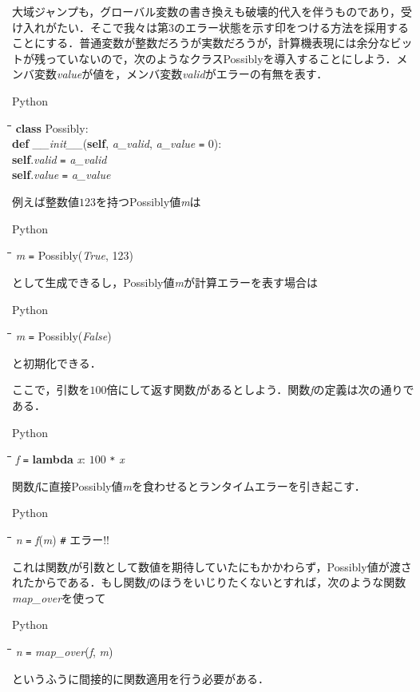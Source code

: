 \documentclass[twocolumn]{jsbook}
\newenvironment{pythoncode}{\begin{itembox}[r]{Python}}{\end{itembox}}
\newenvironment{python}{\begin{tabbing}\hspace*{1em}\=\hspace*{1em}\=\hspace*{1em}\=\hspace*{1em}\=\kill}{\end{tabbing}}
\newcommand{\pthnClassname}[1]{\textrm{#1}}
\newcommand{\pthnId}[1]{\textit{#1}}
\newcommand{\pthnKeyword}[1]{\textbf{#1}}
\newcommand{\pthnOp}[1]{\texttt{#1}}
\begin{document}
大域ジャンプも，グローバル変数の書き換えも破壊的代入を伴うものであり，受け入れがたい．そこで我々は第3のエラー状態を示す印をつける方法を採用することにする．普通変数が整数だろうが実数だろうが，計算機表現には余分なビットが残っていないので，次のようなクラス\pthnClassname{Possibly}を導入することにしよう．メンバ変数\pthnId{value}が値を，メンバ変数\pthnId{valid}がエラーの有無を表す．
\begin{pythoncode}
\begin{python}
\pthnKeyword{class} \pthnClassname{Possibly}:\\
\>\pthnKeyword{def} \pthnId{\_\_init\_\_}(\pthnKeyword{self}, \pthnId{a\_valid}, \pthnId{a\_value} \pthnOp{=} $0$):\\
\>\>\pthnKeyword{self}.\pthnId{valid} \pthnOp{=} \pthnId{a\_valid}\\
\>\>\pthnKeyword{self}.\pthnId{value} \pthnOp{=} \pthnId{a\_value}
\end{python}
\end{pythoncode}

例えば整数値$123$を持つPossibly値\pthnId{m}は
\begin{pythoncode}
\begin{python}
\pthnId{m} \pthnOp{=} \pthnClassname{Possibly}(\pthnId{True}, 123)
\end{python}
\end{pythoncode}
として生成できるし，\pthnClassname{Possibly}値\pthnId{m}が計算エラーを表す場合は
\begin{pythoncode}
\begin{python}
\pthnId{m} \pthnOp{=} \pthnClassname{Possibly}(\pthnId{False})
\end{python}
\end{pythoncode}
と初期化できる．

ここで，引数を$100$倍にして返す関数\pthnId{f}があるとしよう．関数\pthnId{f}の定義は次の通りである．
\begin{pythoncode}
\begin{python}
\pthnId{f} \pthnOp{=} \pthnKeyword{lambda} \pthnId{x}: $100$ \pthnOp{*} \pthnId{x}
\end{python}
\end{pythoncode}

関数\pthnId{f}に直接\pthnClassname{Possibly}値\pthnId{m}を食わせるとランタイムエラーを引き起こす．
\begin{pythoncode}
\begin{python}
\pthnId{n} \pthnOp{=} \pthnId{f}(\pthnId{m}) \texttt{\#} エラー!! 
\end{python}
\end{pythoncode}
これは関数\pthnId{f}が引数として数値を期待していたにもかかわらず，\pthnClassname{Possibly}値が渡されたからである．もし関数\pthnId{f}のほうをいじりたくないとすれば，次のような関数\pthnId{map\_over}を使って
\begin{pythoncode}
\begin{python}
\pthnId{n} \pthnOp{=} \pthnId{map\_over}(\pthnId{f}, \pthnId{m}) 
\end{python}
\end{pythoncode}
というふうに間接的に関数適用を行う必要がある．
\end{document}

